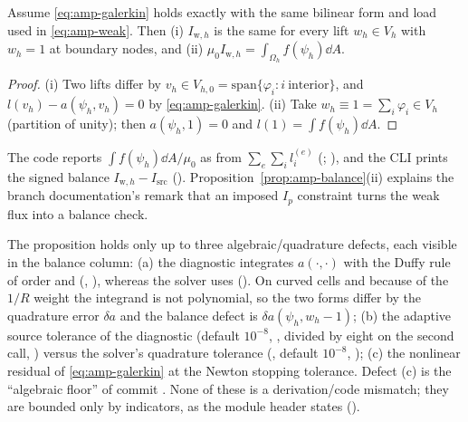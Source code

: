 \begin{proposition}\label{prop:amp-balance}
Assume \eqref{eq:amp-galerkin} holds exactly with the same bilinear form and
load used in \eqref{eq:amp-weak}. Then (i) $I_{\mathrm w,h}$ is the same for
every lift $w_h\in V_h$ with $w_h=1$ at boundary nodes, and (ii)
$\mu_0I_{\mathrm w,h}=\int_{\Omega_h}f(\psi_h)\dd A$.
\end{proposition}
\begin{proof}
(i) Two lifts differ by $v_h\in V_{h,0}=\mathrm{span}\{\varphi_i:i\ \text{interior}\}$, and
$l(v_h)-a(\psi_h,v_h)=0$ by \eqref{eq:amp-galerkin}.
(ii) Take $w_h\equiv1=\sum_i\varphi_i\in V_h$ (partition of unity); then
$a(\psi_h,1)=0$ and $l(1)=\int f(\psi_h)\dd A$.
\end{proof}
The code reports $\int f(\psi_h)\dd A/\mu_0$ as  from
$\sum_e\sum_i l^{(e)}_i$ (;
), and the CLI prints the signed balance
$I_{\mathrm w,h}-I_{\mathrm{src}}$ ().
Proposition~\ref{prop:amp-balance}(ii) explains the branch documentation's
remark that an imposed $I_p$ constraint turns the weak flux into a balance check.

\begin{remark}\label{rem:amp-defects}
The proposition holds only up to three algebraic/quadrature defects, each
visible in the balance column: (a) the diagnostic integrates $a(\cdot,\cdot)$
with the Duffy rule of order  and 
(, ), whereas
the solver uses  ().
On curved cells and because of the $1/R$ weight the integrand is not
polynomial, so the two forms differ by the quadrature error $\delta a$ and the
balance defect is $\delta a(\psi_h,w_h-1)$; (b) the adaptive source tolerance
of the diagnostic (default $10^{-8}$, , divided
by eight on the second call, ) versus the solver's quadrature tolerance
(, default $10^{-8}$, );
(c) the nonlinear residual of \eqref{eq:amp-galerkin} at the Newton stopping
tolerance. Defect (c) is the ``algebraic floor'' of commit . None
of these is a derivation/code mismatch; they are bounded only by indicators,
as the module header states ().
\end{remark}

